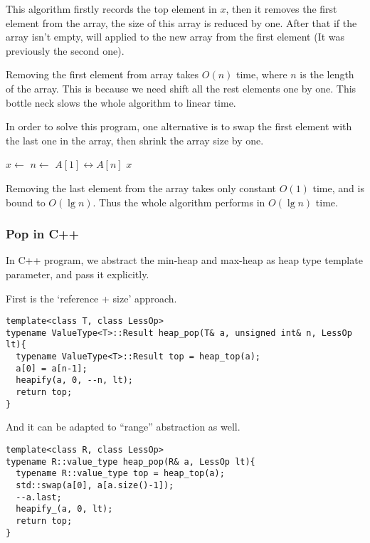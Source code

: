 \documentclass{article}
\begin{document}
This algorithm firstly records the top element in $x$, then
it removes the first element from the array, the size of
this array is reduced by one. After that if the array isn't
empty,  will applied to the new array from
the first element (It was previously the second one).

Removing the first element from array takes $O(n)$ time,
where $n$ is the length of the array. This is because
we need shift all the rest elements one by one.
This bottle neck slows the whole algorithm
to linear time.

In order to solve this program, one alternative is
to swap the first element with the last one in the
array, then shrink the array size by one.

\begin{algorithmic}[1]
  \State $x \gets$ 
  \State $n \gets$ 
  \State {} $A[1] \leftrightarrow A[n]$
  \State {}
    \State {}
  \EndIf
  \State \Return $x$
\EndFunction
\end{algorithmic}

Removing the last element from the array takes
only constant $O(1)$ time, and  is bound to $O(\lg n)$.
Thus the whole algorithm performs in $O(\lg n)$ time.

\subsubsection*{Pop in C++}

In C++ program, we abstract the min-heap and max-heap as heap type
template parameter, and pass it explicitly.

First is the `reference + size' approach.

\lstset{language=C++}
\begin{lstlisting}
template<class T, class LessOp>
typename ValueType<T>::Result heap_pop(T& a, unsigned int& n, LessOp lt){
  typename ValueType<T>::Result top = heap_top(a);
  a[0] = a[n-1];
  heapify(a, 0, --n, lt);
  return top;
}
\end{lstlisting}

And it can be adapted to ``range'' abstraction as well.

\begin{lstlisting}
template<class R, class LessOp>
typename R::value_type heap_pop(R& a, LessOp lt){
  typename R::value_type top = heap_top(a);
  std::swap(a[0], a[a.size()-1]);
  --a.last;
  heapify_(a, 0, lt);
  return top;
}
\end{lstlisting}
\end{document}
